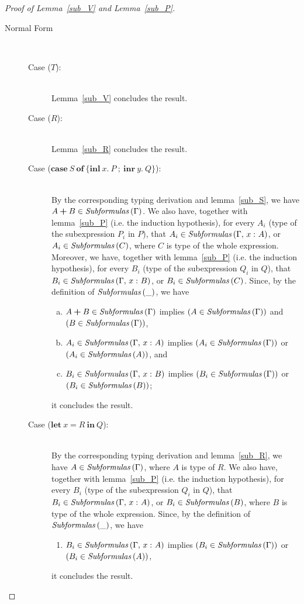 \documentclass[a4paper]{article}
\newcommand{\typecolor}{}
\newcommand{\termcolor}{}
\newcommand{\tp}[1]{{\typecolor #1}}
\newcommand{\tm}[1]{{\termcolor #1}}
\newcommand{\typsum}[2]{#1\boldsymbol{+}#2}
\newcommand{\expshr}[3]{\mathbf{let}\ #1\boldsymbol{=}#2\ \mathbf{in}\ #3}
\newcommand{\expcas}[5]{\mathbf{case}\ #1\ \mathbf{of}\ \boldsymbol{\{}\mathbf{inl}\ #2.\ #3\ \boldsymbol{;}\ \mathbf{inr}\ #4.\ #5\boldsymbol{\}}}
\newcommand{\typing}[2]{\tm{#1:\ }\tp{#2}}
\newcommand{\typenvcon}[2]{\tp{\Gamma,}\ \typing{#1}{#2}}
\newcommand{\txt}[1]{\text{\textit{#1}}}
\newcommand{\subformulas}[1]{\txt{Subformulas}\,(#1)}
\begin{document}
\begin{proof}[Proof of Lemma~\ref{sub_V} and Lemma~\ref{sub_P}]
\begin{description}
\item[Normal Form]\ \\
\begin{description}
\item[Case ($T$):]\ \\
  Lemma~\ref{sub_V} concludes the result.
\item[Case ($R$):]\ \\
  Lemma~\ref{sub_R} concludes the result.
\item[Case ($\expcas{S}{x}{P}{y}{Q}$):]\ \\
  By the corresponding typing derivation and lemma~\ref{sub_S}, we
  have $\typsum{A}{B} \in \subformulas{\Gamma}$. We also have,
  together with lemma~\ref{sub_P} (i.e. the induction hypothesis), for
  every $A_i$ (type of the subexpression $P_i$ in $P$), that $A_i \in
  \subformulas{\typenvcon{x}{A}}$, or $A_i \in \subformulas{C}$, where
  $C$ is type of the whole expression. Moreover, we have, together
  with lemma~\ref{sub_P} (i.e. the induction hypothesis), for every
  $B_i$ (type of the subexpression $Q_i$ in $Q$), that $B_i \in
  \subformulas{\typenvcon{x}{B}}$, or $B_i \in \subformulas{C}$.
  Since, by the definition of $\subformulas{\_}$, we have
  \begin{enumerate}[(a)] 
     \item $\typsum{A}{B} \in \subformulas{\Gamma}$ implies $(A \in \subformulas{\Gamma})$ and $(B \in \subformulas{\Gamma})$,
     \item $A_i \in \subformulas{\typenvcon{x}{A}}$ implies $(A_i \in \subformulas{\Gamma})$ or $(A_i \in \subformulas{A})$, and
     \item $B_i \in \subformulas{\typenvcon{x}{B}}$ implies $(B_i \in \subformulas{\Gamma})$ or $(B_i \in \subformulas{B})$; 
  \end{enumerate}
  it concludes the result. 
\item[Case ($\expshr{x}{R}{Q}$):]\ \\
  By the corresponding typing derivation and lemma~\ref{sub_R}, we
  have $A \in \subformulas{\Gamma}$, where $A$ is type of $R$. We also
  have, together with lemma~\ref{sub_P} (i.e. the induction
  hypothesis), for every $B_i$ (type of the subexpression $Q_i$ in
  $Q$), that $B_i \in \subformulas{\typenvcon{x}{A}}$, or $B_i \in
  \subformulas{B}$, where $B$ is type of the whole expression. Since, by the definition of $\subformulas{\_}$, we have
  \begin{enumerate}[] 
     \item $B_i \in \subformulas{\typenvcon{x}{A}}$ implies $(B_i \in \subformulas{\Gamma})$ or $(B_i \in \subformulas{A})$,
  \end{enumerate}
  it concludes the result.
\end{description}
\end{description}
\end{proof}
\end{document}
